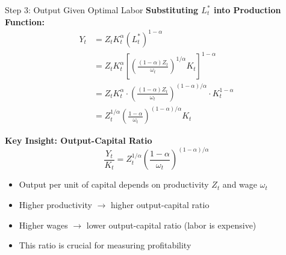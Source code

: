 \documentclass{beamer}
\begin{document}
\begin{frame}{Step 3: Output Given Optimal Labor}
    \textbf{Substituting $L_t^*$ into Production Function:}
    \begin{equation*}
        \begin{aligned}
            Y_t &= Z_t K_t^\alpha \left(L_t^*\right)^{1-\alpha} \\
            &= Z_t K_t^\alpha \left[\left(\frac{(1-\alpha)Z_t}{\omega_t}\right)^{1/\alpha} K_t\right]^{1-\alpha} \\
            &= Z_t K_t^\alpha \cdot \left(\frac{(1-\alpha)Z_t}{\omega_t}\right)^{(1-\alpha)/\alpha} \cdot K_t^{1-\alpha} \\
            &= Z_t^{1/\alpha} \left(\frac{1-\alpha}{\omega_t}\right)^{(1-\alpha)/\alpha} K_t
        \end{aligned}
    \end{equation*}
    
    \textbf{Key Insight: Output-Capital Ratio}
    \begin{equation*}
        \frac{Y_t}{K_t} = Z_t^{1/\alpha} \left(\frac{1-\alpha}{\omega_t}\right)^{(1-\alpha)/\alpha}
    \end{equation*}
    
    \begin{itemize}
        \item Output per unit of capital depends on productivity $Z_t$ and wage $\omega_t$
        \item Higher productivity $\rightarrow$ higher output-capital ratio
        \item Higher wages $\rightarrow$ lower output-capital ratio (labor is expensive)
        \item This ratio is crucial for measuring profitability
    \end{itemize}
\end{frame}
\end{document}
